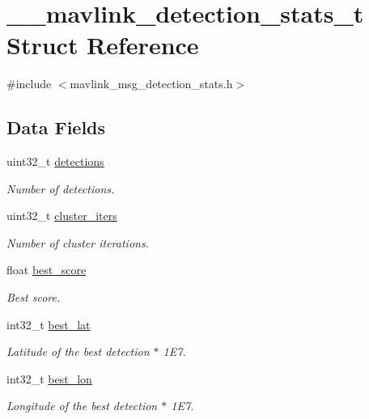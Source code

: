\hypertarget{struct____mavlink__detection__stats__t}{\section{\+\_\+\+\_\+mavlink\+\_\+detection\+\_\+stats\+\_\+t Struct Reference}
\label{struct____mavlink__detection__stats__t}
}


{\ttfamily \#include $<$mavlink\+\_\+msg\+\_\+detection\+\_\+stats.\+h$>$}

\subsection*{Data Fields}
\begin{DoxyCompactItemize}
\item 
uint32\+\_\+t \hyperlink{struct____mavlink__detection__stats__t_aa84f6983a4c9c9b55ef1556f68eb9ac2}{detections}
\begin{DoxyCompactList}\small\item\em Number of detections. \end{DoxyCompactList}\item 
uint32\+\_\+t \hyperlink{struct____mavlink__detection__stats__t_a0d268ba0aa7aa7f74d1046d20636fc4b}{cluster\+\_\+iters}
\begin{DoxyCompactList}\small\item\em Number of cluster iterations. \end{DoxyCompactList}\item 
float \hyperlink{struct____mavlink__detection__stats__t_a0e1d8350f41f0548e907188698e9539e}{best\+\_\+score}
\begin{DoxyCompactList}\small\item\em Best score. \end{DoxyCompactList}\item 
int32\+\_\+t \hyperlink{struct____mavlink__detection__stats__t_ab6b63a2d13bcc212d4091c49321c5c4d}{best\+\_\+lat}
\begin{DoxyCompactList}\small\item\em Latitude of the best detection $\ast$ 1\+E7. \end{DoxyCompactList}\item 
int32\+\_\+t \hyperlink{struct____mavlink__detection__stats__t_ab7d7323072e3faec5fa081e80f38b045}{best\+\_\+lon}
\begin{DoxyCompactList}\small\item\em Longitude of the best detection $\ast$ 1\+E7. \end{DoxyCompactList}\item 

\end{DoxyCompactItemize}
